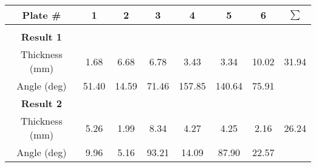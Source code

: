 \documentclass{article}
\begin{document}
    \begin{tabular}{c c c c c c c c}
        \toprule
        Plate \# & 1 & 2 & 3 & 4 & 5 & 6 & $\sum$ \\ 
        \midrule\\
        \textbf{Result 1}\\
        \addlinespace[1.5ex]
        Thickness (\si{\milli \meter}) & 1.68 & 6.68 & 6.78 & 3.43 & 3.34 & 10.02 & 31.94\\
        \addlinespace[1.5ex]
        Angle (deg) & 51.40 & 14.59 & 71.46 & 157.85 & 140.64 & 75.91 \\
        \bottomrule
        \addlinespace[1.5ex]
        \textbf{Result 2}\\
        \addlinespace[1ex]
        Thickness (\si{\milli \meter}) & 5.26 & 1.99 & 8.34 & 4.27 & 4.25 & 2.16 & 26.24\\
        \addlinespace[1.5ex]
        Angle (deg) & 9.96 & 5.16 & 93.21 & 14.09 & 87.90 & 22.57 \\
        \bottomrule
    \end{tabular}
\end{document}
